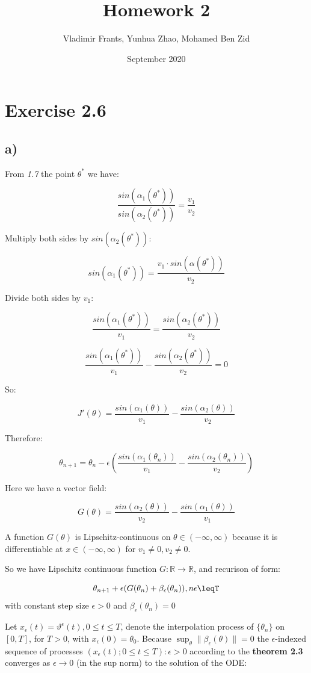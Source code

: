 \documentclass{article}
\title{Homework 2}
\author{Vladimir Frants, Yunhua Zhao, Mohamed Ben Zid}
\date{September 2020}
\begin{document}
\maketitle

\section{Exercise 2.6}

\subsection{a)}

From \emph{1.7} the point $\theta^{*}$ we have: 

$$\frac{sin(\alpha_{1}(\theta^{*}))}{sin(\alpha_{2}(\theta^{*}))} = \frac{v_1}{v_2}$$

Multiply both sides by $sin(\alpha_{2}(\theta^{*}))$:

$$sin(\alpha_{1}(\theta^{*}))=\frac{v_{1}\cdot sin(\alpha(\theta^{*}))}{v_{2}}$$

Divide both sides by $v_{1}$:

$$\frac{sin(\alpha_{1}(\theta^{*}))}{v_{1}}=\frac{sin(\alpha_{2}(\theta^{*}))}{v_{2}}$$

$$\frac{sin(\alpha_{1}(\theta^{*}))}{v_{1}} - \frac{sin(\alpha_{2}(\theta^{*}))}{v_{2}} = 0$$

So: 

$$J'(\theta)= \frac{sin(\alpha_{1}(\theta))}{v_{1}} - \frac{sin(\alpha_{2}(\theta))}{v_{2}}$$

Therefore:

$$\theta_{n+1} = \theta_{n} - \epsilon(\frac{sin(\alpha_{1}(\theta_{n}))}{v_{1}} - \frac{sin(\alpha_{2}(\theta_{n}))}{v_{2}})$$

Here we have a vector field: 

$$G(\theta) = \frac{sin(\alpha_{2}(\theta))}{v_{2}} - \frac{sin(\alpha_{1}(\theta))}{v_{1}}$$

A function $G(\theta)$ is Lipschitz-continuous on $\theta\in(-\infty, \infty)$ because it is differentiable at $x\in{(-\infty, \infty)}$ for $v_1 \neq 0, v_2 \neq 0$. 

So we have Lipschitz continuous function $G:\mathbb{R}\rightarrow\mathbb{R}$, and recurison of form:

$$\theta_{n+1}+\epsilon(G(\theta_{n}) + \beta_{\epsilon}(\theta_n)), n\epsilon\leqT$$
with constant step size $\epsilon > 0$ and $\beta_{\epsilon}(\theta_{n})=0$

Let $x_{\epsilon}(t)=\vartheta^{\epsilon}(t), 0\leq t \leq T$, denote the interpolation process of $\{\theta_{n}\}$ on $[0, T]$, for $T > 0$, with $x_{\epsilon}(0)=\theta_{0}$. Because $\sup_{\theta}\lVert\beta_{\epsilon}(\theta)\rVert=0$ the $\epsilon$-indexed sequence of processes ${(x_{\epsilon}(t); 0\leq t \leq T): \epsilon > 0}$ according to the \textbf{theorem 2.3} converges as $\epsilon \rightarrow 0$ (in the sup norm) to the solution of the ODE:
\end{document}
